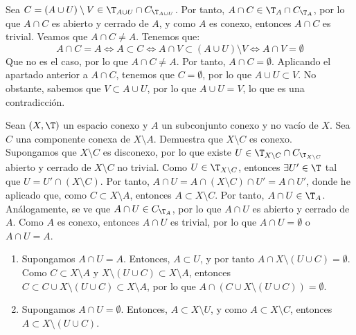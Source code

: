 \begin{ejercicio}
\begin{enumerate}
        Sea $C=(A\cup U)\setminus V\in \T_{A\cup U}\cap C_{\T_{A\cup U}}$. Por tanto, $A\cap C \in \T_A\cap C_{\T_A}$, por lo que $A\cap C$ es abierto y cerrado de $A$, y como $A$ es conexo, entonces $A\cap C$ es trivial.
        Veamos que $A\cap C\neq A$. Tenemos que:
        \begin{equation*}
            A \cap C = A\Longleftrightarrow A\subset C \Longleftrightarrow A\cap V \subset (A\cup U)\setminus V \Longleftrightarrow A\cap V = \emptyset
        \end{equation*}
        Que no es el caso, por lo que $A\cap C\neq A$. Por tanto, $A\cap C=\emptyset$. Aplicando el apartado anterior a $A\cap C$, tenemos que $C=\emptyset$, por lo que $A\cup U \subset V$. No obstante, sabemos que
        $V\subset A\cup U$, por lo que $A\cup U = V$, lo que es una contradicción.
    \end{enumerate}
\end{ejercicio}

\begin{ejercicio}
    Sean $(X, \T)$ un espacio conexo y $A$ un subconjunto conexo y no vacío de $X$. Sea $C$ una componente conexa de $X \setminus A$. Demuestra que $X \setminus C$ es conexo.\\

    Supongamos que $X\setminus C$ es disconexo, por lo que existe $U \in \T_{X\setminus C}\cap C_{\T_{X\setminus C}}$ abierto y cerrado de $X\setminus C$
    no trivial. Como $U\in \T_{X\setminus C}$, entonces $\exists U'\in \T$ tal que $U=U'\cap (X\setminus C)$. Por tanto, $A\cap U=A\cap (X\setminus C) \cap U' = A\cap U'$, donde he aplicado que,
    como $C\subset X\setminus A$, entonces $A\subset X\setminus C$. Por tanto, $A\cap U\in \T_A$. Análogamente, se ve que $A\cap U\in C_{\T_A}$, por lo que $A\cap U$ es abierto y cerrado de $A$. Como $A$ es conexo,
    entonces $A\cap U$ es trivial, por lo que $A\cap U=\emptyset$ o $A\cap U=A$.
    \begin{enumerate}
        \item Supongamos $A\cap U=A$. Entonces, $A\subset U$, y por tanto $A\cap X\setminus (U\cup C) = \emptyset$. Como $C\subset X\setminus A$ y $X\setminus (U\cup C)\subset X\setminus A$, entonces
        $C\subset C\cup X\setminus (U\cup C) \subset X\setminus A$, por lo que $A\cap \left(C\cup X\setminus (U\cup C)\right) = \emptyset$.


        \item Supongamos $A\cap U=\emptyset$. Entonces, $A\subset X\setminus U$, y como $A\subset X\setminus C$, entonces $A\subset X\setminus (U\cup C)$.
    \end{enumerate}
\end{ejercicio}

